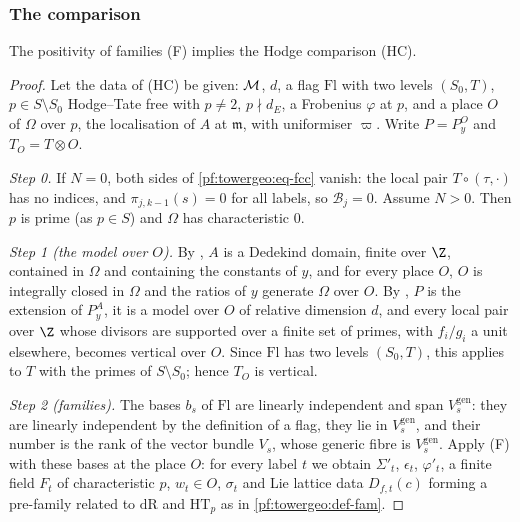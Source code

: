 \subsubsection*{The comparison}

\begin{theorem}\label{pf:towergeo:hodge}
The positivity of families \textup{(F)} implies the Hodge comparison \textup{(HC)}.
\end{theorem}

\begin{proof}
Let the data of (HC) be given: $\mathcal M$, $d$, a flag $\mathrm{Fl}$ with two levels $(S_0,T)$,
$p\in S\setminus S_0$ Hodge--Tate free with $p\ne2$, $p\nmid d_E$, a Frobenius $\varphi$ at $p$, and a place
$O$ of $\Omega$ over $p$, the localisation of $A$ at $\mathfrak m$, with uniformiser $\varpi$. Write
$P=P^O_y$ and $T_O=T\otimes O$.

\emph{Step 0.} If $N=0$, both sides of \eqref{pf:towergeo:eq-fcc} vanish: the local pair
$T\circ(\tau,\cdot)$ has no indices, and $\pi_{j,k-1}(s)=0$ for all labels, so $\mathcal B_j=0$. Assume
$N>0$. Then $p$ is prime (as $p\in S$) and $\Omega$ has characteristic $0$.

\emph{Step 1 (the model over $O$).} By , $A$ is a
Dedekind domain, finite over $\Z$, contained in $\Omega$ and containing the constants of $y$, and for every
place $O$, $O$ is integrally closed in $\Omega$ and the ratios of $y$ generate $\Omega$ over $O$. By
, $P$ is the extension of $P^A_y$, it is a model
over $O$ of relative dimension $d$, and every local pair over $\Z$ whose divisors are supported over a finite
set of primes, with $f_i/g_i$ a unit elsewhere, becomes vertical over $O$. Since $\mathrm{Fl}$ has two levels
$(S_0,T)$, this applies to $T$ with the primes of $S\setminus S_0$; hence $T_O$ is vertical.

\emph{Step 2 (families).} The bases $b_s$ of $\mathrm{Fl}$ are linearly independent and span
$V^{\mathrm{gen}}_s$: they are linearly independent by the definition of a flag, they lie in
$V^{\mathrm{gen}}_s$, and their number is the rank of the vector bundle $V_s$, whose generic fibre is
$V^{\mathrm{gen}}_s$. Apply (F) with these bases at the place $O$: for every label $t$ we obtain $\Sigma'_t$,
$\epsilon_t$, $\varphi'_t$, a finite field $F_t$ of characteristic $p$, $w_t\in O$, $\sigma_t$ and Lie lattice
data $D_{f,t}(c)$ forming a pre-family related to $\mathrm{dR}$ and $\mathrm{HT}_p$ as in
\cref{pf:towergeo:def-fam}.


\end{proof}
